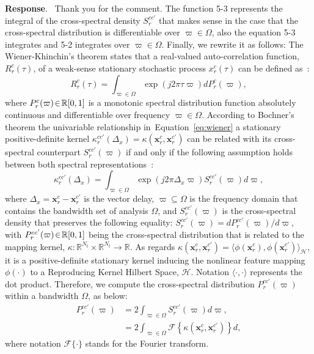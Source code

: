 \documentclass[runningheads]{llncs}
\newcommand{\en}{\negthinspace\in\negthinspace }
\newcommand{\Real}{\mathbb{R}}
\newcommand{\ve}[1]{\bm {#1}}
\newenvironment{reviewer}{\setcounter{pointcounter}{1}}{}
\newcommand{\changes}[1]{\textcolor[rgb]{1.00,0.00,0.00}{#1}}
\newcommand{\reply}{\medskip \noindent \textbf{Response}.\ }
\begin{document}
\begin{reviewer}
\reply{
    Thank you for the comment. The function 5-3 represents the integral of the cross-spectral density $S^{cc'}_{r}$ that makes sense in the case that the cross-spectral distribution is differentiable over $\varpi \in \Omega$, also the equation 5-3 integrates and 5-2 integrates over $\varpi \in \Omega$. Finally, we rewrite it as follows:
    \changes{The Wiener-Khinchin's theorem states that a real-valued auto-correlation function, $R^{c}_{r}(\tau)$, of a weak-sense stationary stochastic process $x^{c}_{r}(\tau)$ can be defined as~\cite{cohen1998generalization}:
    \begin{equation}\label{eq:wiener}
        R^{c}_{r}(\tau) = \int_{\varpi \in \Omega}\exp({j2\pi \tau \varpi})dP^{c}_{r}(\varpi) ,
    \end{equation}
    where $P^{c}_{r}(\varpi)\en\Real[0,1]$ is a monotonic spectral distribution function absolutely continuous and differentiable over frequency $\varpi \in \Omega$.
    According to Bochner's theorem the univariable relationship in~Equation~\eqref{eq:wiener} a stationary positive-definite kernel \changes{$\kappa^{cc'}_{r}(\Delta_{x}) = \kappa(\ve{x}^{c}_{r},\ve{x}^{c'}_{r})$} can be related with its cross-spectral counterpart $S^{cc'}_{r}(\varpi)$ if and only if the following assumption holds between both spectral representations~\cite{bochner2020harmonic}:
    \begin{equation}\label{eq:kCSD}
        \kappa^{cc'}_{r}(\Delta_{x}) = \int_{\varpi \in \Omega} \exp{(j2\pi {\Delta_{x}} \varpi)} S^{cc'}_{r}(\varpi)d\varpi,
    \end{equation}
    where $\Delta_{x} = \ve{x}^{c}_{r} - \ve{x}^{c'}_{r}$ is the vector delay, $\varpi\subseteq\varOmega$ is the frequency domain that contains the bandwidth set of analysis $\varOmega$, and $ S^{cc'}_{r}(\varpi)$ is the cross-spectral density that preserves the following equality: $ S^{cc'}_{r}(\varpi) = d {P}^{cc'}_{r}(\varpi)/d\varpi$, with $ P^{cc'}_{r}(\varpi)\en\Real[0,1]$ being the cross-spectral distribution that is related to the mapping kernel, $\kappa: \Real^{N_t} \times \Real^{N_t}\to \Real$.
    As regards $\kappa(\ve{x}^{c}_{r},\ve{x}^{c'}_{r}) = \langle \phi(\ve{x}^{c}_{r}),\phi(\ve{x}^{c'}_{r}) \rangle_{\mathcal{H}}$, it is a positive-definite stationary kernel inducing the nonlinear feature mapping $\phi(\cdot)$ to a Reproducing Kernel Hilbert Space, $\mathcal{H}$. Notation $\langle \cdot,\cdot \rangle$ represents the dot product. 
    Therefore, we compute the cross-spectral distribution $ P^{cc'}_{r}(\varpi)$ within a bandwidth $\varOmega$, as below:
    \begin{equation}
        \begin{aligned}\label{eq:CSDist}
            P^{cc'}_{r}(\varpi) &= 2\int_{\varpi \in \varOmega} S^{cc'}_{r}(\varpi)d\varpi,\\
            &=2\int_{\varpi \in \varOmega} \mathscr{F}\left\{\kappa(\ve{x}^{c}_{r},\ve{x}^{c'}_{r}) \right\}d,
        \end{aligned}
    \end{equation}
    where notation $\mathscr{F}\{\cdot\}$ stands for the Fourier transform. 
    }
}


\end{reviewer}
\end{document}
